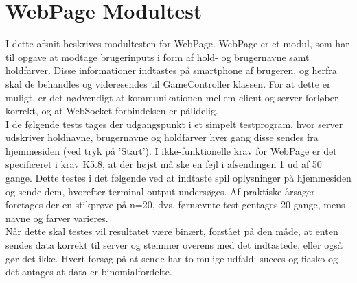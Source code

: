 \documentclass[Modultest/Modultest_main.tex]{subfiles}
\begin{document}
\lstset{style=customc}

\section{WebPage Modultest}
I dette afsnit beskrives modultesten for WebPage. WebPage er et modul, som har til opgave at modtage brugerinputs i form af hold- og brugernavne samt holdfarver. Disse informationer indtastes på smartphone af brugeren, og herfra skal de behandles og videresendes til GameController klassen. For at dette er muligt, er det nødvendigt at kommunikationen mellem client og server forløber korrekt, og at WebSocket forbindelsen er pålidelig.\\I de følgende tests tages der udgangspunkt i et simpelt testprogram, hvor server udskriver holdnavne, brugernavne og holdfarver hver gang disse sendes fra hjemmesiden (ved tryk på 'Start'). I ikke-funktionelle krav for WebPage er det specificeret i krav K5.8, at der højst må ske en fejl i afsendingen 1 ud af 50 gange. Dette testes i det følgende ved at indtaste spil oplysninger på hjemmesiden og sende dem, hvorefter terminal output undersøges. Af praktiske årsager foretages der en stikprøve på n=20, dvs. førnævnte test gentages 20 gange, mens navne og farver varieres.
\\Når dette skal testes vil resultatet være binært, forstået på den måde, at enten sendes data korrekt til server og stemmer overens med det indtastede, eller også gør det ikke. Hvert forsøg på at sende har to mulige udfald: succes og fiasko og det antages at data er binomialfordelte. 
\end{document}
